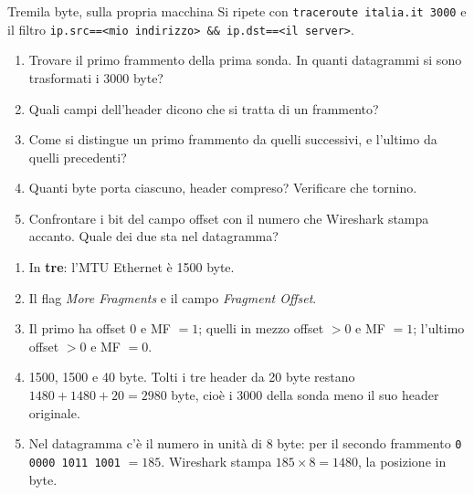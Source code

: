 \begin{esercizio}{Tremila byte, sulla propria macchina}
Si ripete con \texttt{traceroute italia.it 3000} e il filtro \texttt{ip.src==<mio indirizzo> \&\& ip.dst==<il server>}.
\begin{enumerate}[label=(\alph*)]
    \item Trovare il primo frammento della prima sonda. In quanti datagrammi si sono trasformati i 3000 byte?
    \item Quali campi dell'header dicono che si tratta di un frammento?
    \item Come si distingue un primo frammento da quelli successivi, e l'ultimo da quelli precedenti?
    \item Quanti byte porta ciascuno, header compreso? Verificare che tornino.
    \item Confrontare i bit del campo offset con il numero che Wireshark stampa accanto. Quale dei due sta nel datagramma?
\end{enumerate}

\svolgimento
\begin{enumerate}[label=(\alph*)]
    \item In \textbf{tre}: l'MTU Ethernet è 1500 byte.
    \item Il flag \emph{More Fragments} e il campo \emph{Fragment Offset}.
    \item Il primo ha offset 0 e MF $= 1$; quelli in mezzo offset $> 0$ e MF $= 1$; l'ultimo offset $> 0$ e MF $= 0$.
    \item 1500, 1500 e 40 byte. Tolti i tre header da 20 byte restano $1480 + 1480 + 20 = 2980$ byte, cioè i 3000 della sonda
          meno il suo header originale.
    \item Nel datagramma c'è il numero in unità di 8 byte: per il secondo frammento \texttt{0 0000 1011 1001} $= 185$.
          Wireshark stampa $185 \times 8 = 1480$, la posizione in byte.
\end{enumerate}
\end{esercizio}


